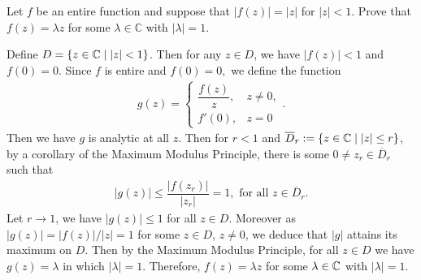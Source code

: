 \begin{problem}
Let $f$ be an entire function and suppose that $|f(z)|=|z|$ for $|z|<1$. Prove that $f(z)=\lambda z$ for some $\lambda\in \mathbb{ C}$ with $|\lambda|=1.$
\begin{solution}
Define $D = \left\{ z \in \mathbb{C} \mid |z| < 1\right\}$. Then for any $z \in D$, we have $|f(z)| < 1$ and $f(0) = 0$. Since $f$ is entire and $f(0)=0,$ we define the function
\begin{align*}
    g(z)=\begin{cases}
    \dfrac{f(z)}{z},&z\ne 0,\\
    f'(0),&z=0
    \end{cases}.
\end{align*}
Then we have $g$ is analytic at all $z$. Then for $r < 1$ and $ \overline{D}_r := \left\{ z \in \mathbb{C} \mid |z| \le r\right\}$, by a corollary of the Maximum Modulus Principle, there is some $0 \neq z_r \in \overline{D}_r$ such that 
\begin{align*}
    |g(z)| \le \dfrac{|f(z_r)|}{|z_r|} =1,\text{ for all } z \in \overline{D}_r.
\end{align*}
Let $r \to 1$, we have $|g(z)|\le 1$ for all $z \in D$. Moreover as $|g(z)| = |f(z)|/|z|=1$ for some $z \in D$, $z \ne 0$, we deduce that $|g|$ attains its maximum on $D$. Then by the Maximum Modulus Principle, for all $z\in D$ we have $g(z) = \lambda$ in which $|\lambda| = 1$. Therefore, $f(z) = \lambda z$ for some $\lambda \in \mathbb{C}$ with $|\lambda| = 1$.
\end{solution}
\end{problem}

